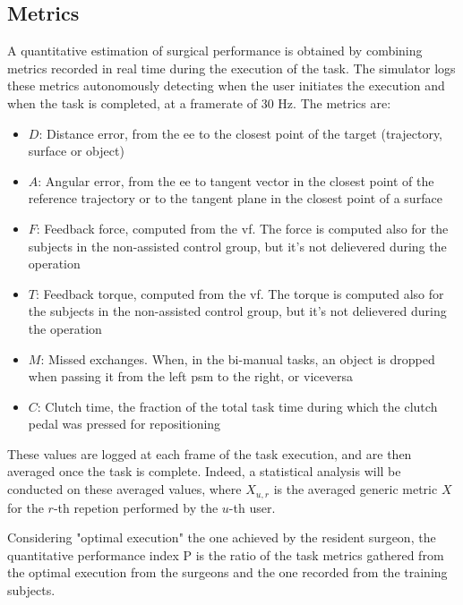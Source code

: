 \documentclass{article}
\begin{document}
\begin{multicols}{2}
\subsection{Metrics}
A quantitative estimation of surgical performance is obtained by combining metrics recorded in real time during the execution of the task. The simulator logs these metrics autonomously detecting when the user initiates the execution and when the task is completed, at a framerate of 30 Hz. The metrics are:
\begin{itemize}
  \item $D$: Distance error, from the \ac{ee} to the closest point of the target (trajectory, surface or object)
  \item $A$: Angular error, from the \ac{ee} to tangent vector in the closest point of the reference trajectory or to the tangent plane in the closest point of a surface
  \item $F$: Feedback force, computed from the \ac{vf}. The force is computed also for the subjects in the non-assisted control group, but it's not delievered during the operation
  \item $T$: Feedback torque, computed from the \ac{vf}. The torque is computed also for the subjects in the non-assisted control group, but it's not delievered during the operation
  \item $M$: Missed exchanges. When, in the bi-manual tasks, an object is dropped when passing it from the left \ac{psm} to the right, or viceversa
  \item $C$: Clutch time, the fraction of the total task time during which the clutch pedal was pressed for repositioning
\end{itemize} 
These values are logged at each frame of the task execution, and are then averaged once the task is complete. Indeed, a statistical analysis will be conducted on these averaged values, where $X_{u,r}$ is the averaged generic metric $X$ for the $r$-th repetion performed by the $u$-th user.

Considering "optimal execution" the one achieved by the resident surgeon, the quantitative performance index P is the ratio of the task metrics gathered from the optimal execution from the surgeons and the one recorded from the training subjects. 



\end{multicols}
\end{document}

